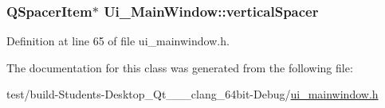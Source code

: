 \subsubsection[{vertical\+Spacer}]{\setlength{\rightskip}{0pt plus 5cm}Q\+Spacer\+Item$\ast$ Ui\+\_\+\+Main\+Window\+::vertical\+Spacer}\label{class_ui___main_window_a8384329c3663ff274e926a12024aab52}


Definition at line 65 of file ui\+\_\+mainwindow.\+h.



The documentation for this class was generated from the following file\+:\begin{DoxyCompactItemize}
\item 
test/build-\/\+Students-\/\+Desktop\+\_\+\+Qt\+\_\+\_\+\_\+clang\+\_\+64bit-\/\+Debug/\hyperlink{ui__mainwindow_8h}{ui\+\_\+mainwindow.\+h}\end{DoxyCompactItemize}
